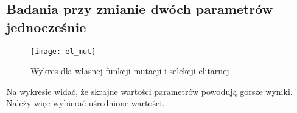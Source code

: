 \subsection{Badania przy zmianie dwóch parametrów jednocześnie}

\begin{figure}[H]
	\centering
	\hspace*{-0.8in}
	\texttt{[image: el\_mut]}
	\caption{Wykres dla własnej funkcji mutacji i selekcji elitarnej}  
	\label{rys:el_mut} 
\end{figure}

Na wykresie widać, że skrajne wartości parametrów powodują gorsze wyniki. Należy więc wybierać uśrednione wartości.